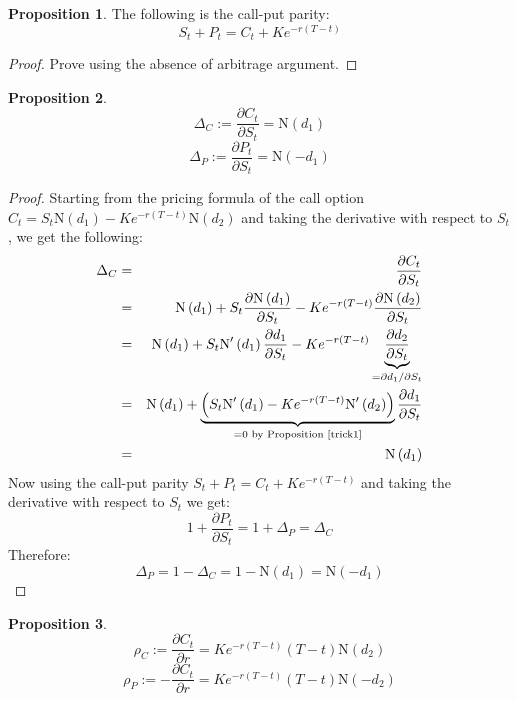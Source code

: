\documentclass[11pt]{article}
\theoremstyle{definition}
\newtheorem{prop}{Proposition}[section]
\newcommand{\brac}[1]{\left(#1\right)}
\newcommand{\pardiff}[2]{\frac{\partial #1}{\partial #2}}
\newcommand{\normcdf}[1]{\text{N}\brac{#1}}
\newcommand{\normpdf}[1]{\text{N}'\brac{#1}}
\begin{document}
	\begin{prop}\label{callputparity}
		The following is the call-put parity:
		$$ S_t + P_t = C_t + Ke^{-r\brac{T-t}}$$
	\end{prop}
	\begin{proof}
		Prove using the absence of arbitrage argument.
	\end{proof}
	\begin{prop}
		$$\Delta_{C} := \pardiff{C_t}{S_t} = \normcdf{d_1}$$
		$$\Delta_{P} := \pardiff{P_t}{S_t} = \normcdf{-d_1}$$
	\end{prop}
	\begin{proof}
		Starting from the pricing formula of the call option $ C_t = S_t\normcdf{d_1} - Ke^{-r\brac{T-t}}\normcdf{d_2}$ and taking the derivative with respect to $S_t$, we get the following:
		\begin{eqnarray*}
			\Delta_C &=& \pardiff{C_t}{S_t}\\
			&=& \normcdf{d_1} + S_t\pardiff{\normcdf{d_1}}{S_t} - Ke^{-r\brac{T-t}}\pardiff{\normcdf{d_2}}{S_t}\\
			&=& \normcdf{d_1} + S_t\normpdf{d_1}\pardiff{d_1}{S_t} - Ke^{-r\brac{T-t}}\underbrace{\pardiff{d_2}{S_t}}_{=\partial d_1/\partial S_t}\\
			&=& \normcdf{d_1} + \underbrace{\brac{S_t\normpdf{d_1}-Ke^{-r\brac{T-t}}\normpdf{d_2}}}_{= 0 \text{ by Proposition \ref{trick1}}}\pardiff{d_1}{S_t}\\
			&=& \normcdf{d_1}
		\end{eqnarray*}
		Now using the call-put parity $S_t + P_t = C_t + Ke^{-r\brac{T-t}}$ and taking the derivative with respect to $S_t$ we get:
		$$ 1 + \pardiff{P_t}{S_t} = 1 + \Delta_P = \Delta_C$$
		Therefore:
		$$ \Delta_P = 1 - \Delta_C = 1 - \normcdf{d_1} = \normcdf{-d_1}$$
	\end{proof}
	\begin{prop}
		$$ \rho_C := \pardiff{C_t}{r} = Ke^{-r\brac{T-t}}\brac{T-t}\normcdf{d_2}$$
		$$ \rho_P := -\pardiff{C_t}{r} = Ke^{-r\brac{T-t}}\brac{T-t}\normcdf{-d_2}$$
	\end{prop}
\end{document}
